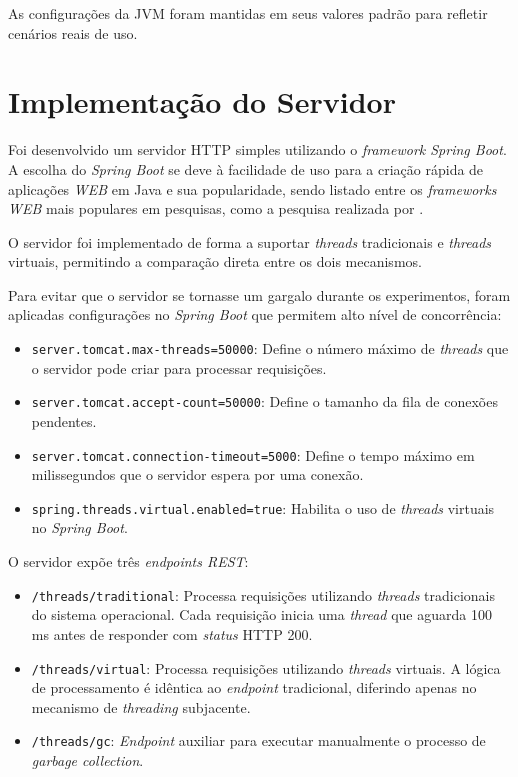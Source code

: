 \documentclass[12pt, openright, oneside, a4paper, english,	french,	spanish, brazil	]{abntex2}
\begin{document}
    As configurações da JVM foram mantidas em seus valores padrão para refletir cenários reais de uso.

    \section{Implementação do Servidor}

    Foi desenvolvido um servidor HTTP simples utilizando o \textit{framework Spring Boot}. A escolha do \textit{Spring Boot} se deve à facilidade de uso para a criação rápida de aplicações \textit{WEB} em Java e sua popularidade, sendo listado entre os \textit{frameworks WEB} mais populares em pesquisas, como a pesquisa realizada por .

    O servidor foi implementado de forma a suportar \textit{threads} tradicionais e \textit{threads} virtuais, permitindo a comparação direta entre os dois mecanismos.

    Para evitar que o servidor se tornasse um gargalo durante os experimentos, foram aplicadas configurações no \textit{Spring Boot} que permitem alto nível de concorrência:
    \begin{itemize}
        \item \texttt{server.tomcat.max-threads=50000}: Define o número máximo de \textit{threads} que o servidor pode criar para processar requisições.
        \item \texttt{server.tomcat.accept-count=50000}: Define o tamanho da fila de conexões pendentes.
        \item \texttt{server.tomcat.connection-timeout=5000}: Define o tempo máximo em milissegundos que o servidor espera por uma conexão.
        \item \texttt{spring.threads.virtual.enabled=true}: Habilita o uso de \textit{threads} virtuais no \textit{Spring Boot}.
    \end{itemize}

    O servidor expõe três \textit{endpoints REST}:

    \begin{itemize}
        \item \texttt{/threads/traditional}: Processa requisições utilizando \textit{threads} tradicionais do sistema operacional. Cada requisição inicia uma \textit{thread} que aguarda 100 ms antes de responder com \textit{status} HTTP 200.
        \item \texttt{/threads/virtual}: Processa requisições utilizando \textit{threads} virtuais. A lógica de processamento é idêntica ao \textit{endpoint} tradicional, diferindo apenas no mecanismo de \textit{threading} subjacente.
        \item \texttt{/threads/gc}: \textit{Endpoint} auxiliar para executar manualmente o processo de \textit{garbage collection}.
    \end{itemize}
\end{document}
